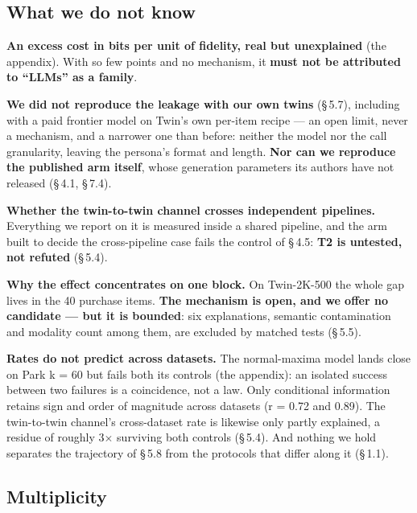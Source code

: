\documentclass[sigconf,anonymous,review]{acmart}
\begin{document}
\subsection{What we do not know}

\textbf{An excess cost in bits per unit of fidelity, real but unexplained} (the appendix). With so few points and no mechanism, it \textbf{must not be attributed to ``LLMs'' as a family}.

\textbf{We did not reproduce the leakage with our own twins} (\S\,5.7), including with a paid frontier model on Twin's own per-item recipe --- an open limit, never a mechanism, and a narrower one than before: neither the model nor the call granularity, leaving the persona's format and length. \textbf{Nor can we reproduce the published arm itself}, whose generation parameters its authors have not released (\S\,4.1, \S\,7.4).

\textbf{Whether the twin-to-twin channel crosses independent pipelines.} Everything we report on it is measured inside a shared pipeline, and the arm built to decide the cross-pipeline case fails the control of \S\,4.5: \textbf{T2 is untested, not refuted} (\S\,5.4).

\textbf{Why the effect concentrates on one block.} On Twin-2K-500 the whole gap lives in the 40 purchase items. \textbf{The mechanism is open, and we offer no candidate --- but it is bounded}: six explanations, semantic contamination and modality count among them, are excluded by matched tests (\S\,5.5).

\textbf{Rates do not predict across datasets.} The normal-maxima model lands close on Park k = 60 but fails both its controls (the appendix): an isolated success between two failures is a coincidence, not a law. Only conditional information retains sign and order of magnitude across datasets (r = 0.72 and 0.89). The twin-to-twin channel's cross-dataset rate is likewise only partly explained, a residue of roughly 3$\times$ surviving both controls (\S\,5.4). And nothing we hold separates the trajectory of \S\,5.8 from the protocols that differ along it (\S\,1.1).

\subsection{Multiplicity}
\end{document}
